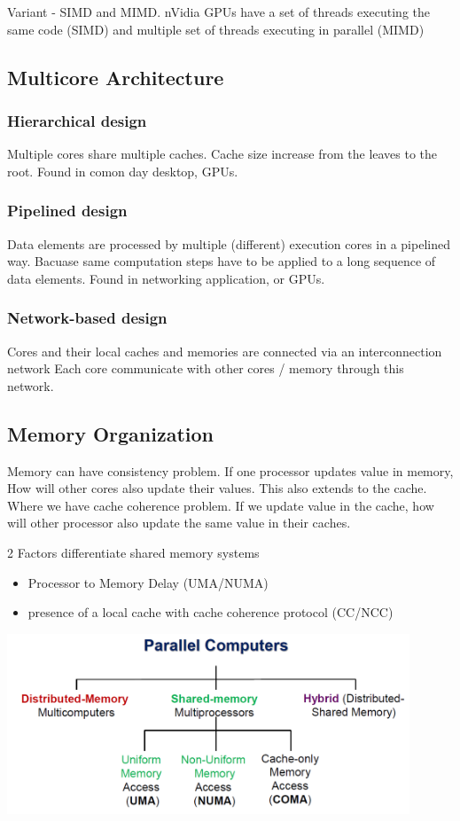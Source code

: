 \documentclass{article}
\begin{document}
Variant - SIMD and MIMD. nVidia GPUs have a set of threads executing the same code (SIMD) and multiple set of threads executing in parallel (MIMD)

\subsection{Multicore Architecture}
\subsubsection{Hierarchical design}
Multiple cores share multiple caches.
Cache size increase from the leaves to the root.
Found in comon day desktop, GPUs.

\subsubsection{Pipelined design}
Data elements are processed by multiple (different) execution cores in a pipelined way.
Bacuase same computation steps have to be applied to a long sequence of data elements.
Found in networking application, or GPUs.

\subsubsection{Network-based design}
Cores and their local caches and memories are connected via an interconnection network
Each core communicate with other cores / memory through this network.

\subsection{Memory Organization}
Memory can have consistency problem.
If one processor updates value in memory, How will other cores also update their values.
This also extends to the cache. Where we have cache coherence problem.
If we update value in the cache, how will other processor also update the same value in their caches.

2 Factors differentiate shared memory systems
\begin{itemize}
    \item Processor to Memory Delay (UMA/NUMA)
    \item presence of a local cache with cache coherence protocol (CC/NCC)
\end{itemize}

\includegraphics[width=0.9\textwidth]{l3_memory_organization}
\end{document}
